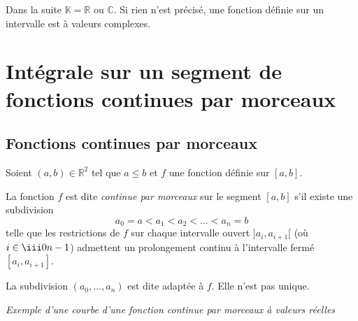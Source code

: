 \documentclass[french,11pt,twoside]{VcCours}
\begin{document}

\tableofcontents
\separationTitre

\newpage
Dans la suite $\mathbb{K}= \mathbb{R}$ ou $\mathbb{C}$. Si rien n'est précisé, une fonction définie sur un intervalle est à valeurs complexes.

\section{Intégrale sur un segment de fonctions continues par morceaux}

\subsection{Fonctions continues par morceaux}

\begin{Definition}{}
Soient $(a,b) \in \mathbb{R}^2$ tel que $a \leq b$ et $f$ une fonction définie sur $[a,b]$.

La fonction $f$ est dite \emph{continue par morceaux} sur le segment $[a,b]$ s'il existe une subdivision
\[a_0 = a < a_1 < a_2 < \dots < a_n =b\]
telle que les restrictions de $f$ sur chaque intervalle ouvert $]a_i,a_{i+1}[$ (où $i \in \iii0{n-1}$) admettent un prolongement continu à l'intervalle fermé $[a_i,a_{i+1}]$.
\end{Definition}

\begin{Remarque}{} La subdivision $(a_0, \ldots, a_n)$ est dite adaptée à $f$. Elle n'est pas unique.
\end{Remarque}

\begin{center}
\emph{Exemple d'une courbe d'une fonction continue par morceaux à valeurs réelles}
\end{center}
\end{document}

